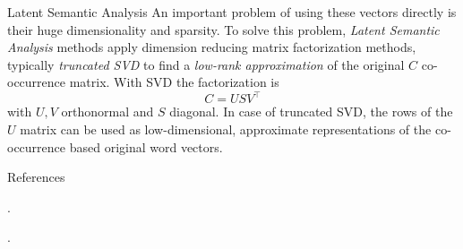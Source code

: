 \documentclass[style=upen, size=14pt]{powerdot}
\newcommand{\gold}{\color{arany}}
\theoremstyle{definition}
\begin{document}
\begin{slide}[toc=LSA]{Latent Semantic Analysis}
  An important problem of using these vectors directly is their huge
  dimensionality and sparsity. To solve this problem, \emph{\gold Latent
    Semantic Analysis} methods apply dimension reducing matrix factorization
  methods, typically \emph{truncated SVD} to find a \emph{low-rank
    approximation} of the original $C$ co-occurrence matrix. With SVD the factorization is
  $$
  C = USV^\intercal
  $$
  with $U,V$ orthonormal and $S$ diagonal. In case of truncated SVD, the rows of
  the $U$ matrix can be used as low-dimensional, approximate representations of
  the co-occurrence based original word vectors.
\end{slide}

\begin{slide}{References}
  
  \begin{footnotesize}

    .\medskip

    .\medskip

  \end{footnotesize}
\end{slide}


    
\end{document}

